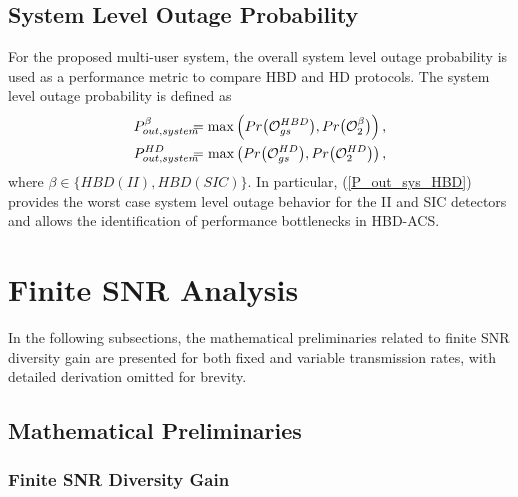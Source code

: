 \subsection{System Level Outage Probability}
For the proposed multi-user system, the overall system level outage probability is used as a performance metric to compare HBD and HD protocols. The system level outage probability is defined as
\begin{eqnarray} 
P_{out,system}^{\beta} \hspace{-0.1in} & = &\hspace{-0.1in} \max\left(Pr\big(\mathcal{O}_{gs}^{HBD}\big),Pr\big(\mathcal{O}_{2}^{\beta}\big)\right), \label{P_out_sys_HBD}\\
P_{out,system}^{HD} \hspace{-0.1in} & = &\hspace{-0.1in} \max\left(Pr\big(\mathcal{O}_{gs}^{HD}\big),Pr\big(\mathcal{O}_{2}^{HD}\big)\right), \label{P_out_sys_HD}
\end{eqnarray}
where $\beta \in \{HBD(II), HBD(SIC)\}$. In particular, (\ref{P_out_sys_HBD}) provides the worst case system level outage behavior for the II and SIC detectors and allows the identification of performance bottlenecks in HBD-ACS.

\section{Finite SNR Analysis} \label{section:ch4_finite_SNR}

In the following subsections, the mathematical preliminaries related to finite SNR diversity gain are presented for both fixed and variable transmission rates, with detailed derivation omitted for brevity.
\subsection{Mathematical Preliminaries}
\subsubsection{Finite SNR Diversity Gain}

